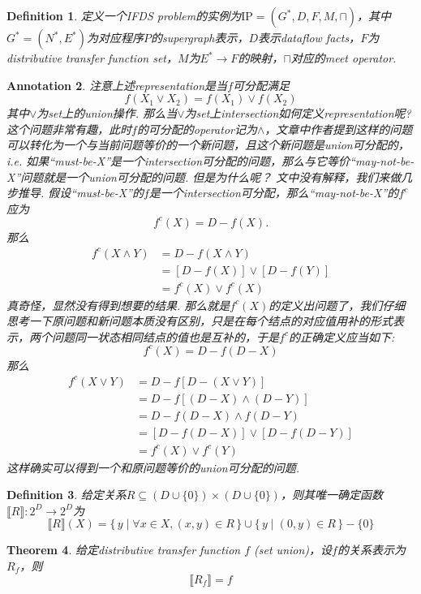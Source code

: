\documentclass{article}
\newtheorem{theorem}{Theorem}[section]
\newtheorem{definition}[theorem]{Definition}
\newtheorem{annotation}[theorem]{Annotation}
\newcommand*{\xfunc}[4]{{#2}\colon{#3}{#1}{#4}}
\newcommand*{\func}[3]{\xfunc{\to}{#1}{#2}{#3}}
\newcommand\Set[2]{\{\,#1\mid#2\,\}} %
\begin{document}
\begin{definition}
\rm 定义一个IFDS problem的实例为$\text{IP}=(G^*,D,F,M,\sqcap)$，其中$G^*=(N^*,E^*)$为对应程序$P$的supergraph表示，$D$表示dataflow facts，$F$为distributive transfer function set，$M$为$E^* \to F$的映射，$\sqcap$对应的meet operator. 
\end{definition}

\begin{annotation}
\rm 注意上述representation是当$f$可分配满足
$$
f(X_1 \vee X_2) = f(X_1) \vee f(X_2)
$$
其中$\vee$为set上的union操作. 那么当$\vee$为set上intersection如何定义representation呢? 这个问题非常有趣，此时$f$的可分配的operator记为$\wedge$，文章中作者提到这样的问题可以转化为一个与当前问题等价的一个新问题，且这个新问题是union可分配的，i.e. 如果“must-be-X”是一个intersection可分配的问题，那么与它等价“may-not-be-X”问题就是一个union可分配的问题. 但是为什么呢？ 文中没有解释，我们来做几步推导. 假设“must-be-X”的$f$是一个intersection可分配，那么“may-not-be-X”的$f^c$应为
$$
f^c(X) = D - f(X). 
$$
那么
$$
\begin{aligned}
f^c(X \wedge Y) &= D-f(X \wedge Y)\\ 
&= [D-f(X)] \vee [D-f(Y)] \\
&= f^c(X) \vee f^c(X)
\end{aligned}
$$
真奇怪，显然没有得到想要的结果. 那么就是$f^c(X)$的定义出问题了，我们仔细思考一下原问题和新问题本质没有区别，只是在每个结点的对应值用补的形式表示，两个问题同一状态相同结点的值也是互补的，于是$f^c$的正确定义应当如下:
$$
f^c(X)= D - f(D-X)
$$
那么
$$
\begin{aligned}
f^c(X \vee Y) &= D-f[D-(X \vee Y)] \\ 
&= D-f[(D-X) \wedge (D-Y)] \\
&= D-f(D-X) \wedge f(D-Y) \\
&= [D-f(D-X)] \vee [D-f(D-Y)] \\
&= f^c(X) \vee f^c(Y) 
\end{aligned}
$$
这样确实可以得到一个和原问题等价的union可分配的问题. 
\end{annotation}


\begin{definition}
\rm 给定关系$R \subseteq (D \cup \{0\}) \times (D \cup \{0\})$，则其唯一确定函数$\func{\llbracket R \rrbracket}{2^D}{2^D}$为
$$
\llbracket R \rrbracket(X) = \Set{y}{\forall x \in X, (x,y) \in R} \cup \Set{y}{(0,y) \in R } - \{0\}
$$
\end{definition}

\begin{theorem}\label{representation correctness}
\rm 给定distributive transfer function $f$ (set union)，设$f$的关系表示为$R_f$，则
$$
\llbracket R_f \rrbracket = f
$$
\end{theorem}
\end{document}
